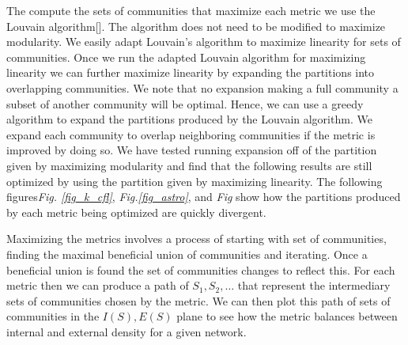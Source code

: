 \documentclass[conference]{IEEEtran}
\begin{document}
The compute the sets of communities that maximize each metric we use the Louvain algorithm[].  The algorithm does not need to be modified to maximize modularity.  We easily adapt Louvain's algorithm to maximize linearity for sets of communities.  Once we run the adapted Louvain algorithm for maximizing linearity we can further maximize linearity by expanding the partitions into overlapping communities.  We note that no expansion making a full community a subset of another community will be optimal.  Hence, we can use a greedy algorithm to expand the partitions produced by the Louvain algorithm.  We expand each community to overlap neighboring communities if the metric is improved by doing so.  We have tested running expansion off of the partition given by maximizing modularity and find that the following results are still optimized by using the partition given by maximizing linearity.  The following figures{\it Fig. \ref{fig_k_cfl}}, {\it Fig.\ref{fig_astro}}, and {\it Fig} show how the partitions produced by each metric being optimized are quickly divergent.

Maximizing the metrics involves a process of starting with set of communities, finding the maximal beneficial union of communities and iterating.  Once a beneficial union is found the set of communities changes to reflect this.  For each metric then we can produce a path of $S_1, S_2, \dots$ that represent the intermediary sets of communities chosen by the metric.  We can then plot this path of sets of communities in the $I(S), E(S)$ plane to see how the metric balances between internal and external density for a given network.
\end{document}
